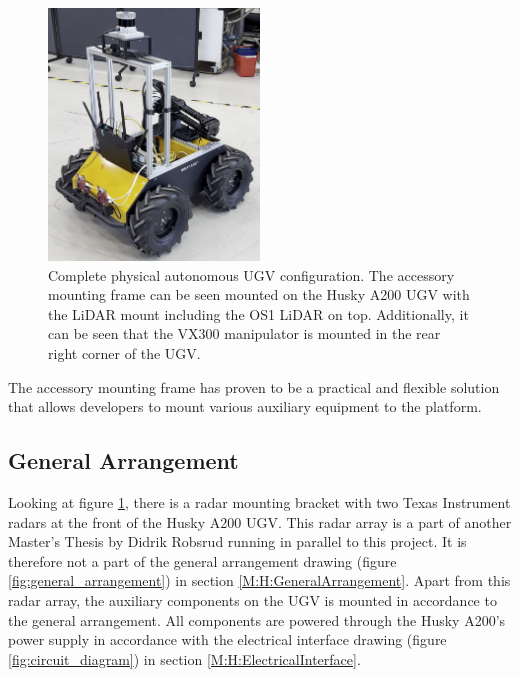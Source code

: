 \begin{figure}[ht]
  \centering
  \includegraphics[width = 0.5\textwidth]{Figures/figHuskyComplete.png}
  \caption{Complete physical autonomous UGV configuration. The accessory mounting frame can be seen mounted on the Husky A200 UGV with the LiDAR mount including the OS1 LiDAR on top. Additionally, it can be seen that the VX300 manipulator is mounted in the rear right corner of the UGV.}
  \label{fig:huskyComplete}
\end{figure}

The accessory mounting frame has proven to be a practical and flexible solution that allows developers to mount various auxiliary equipment to the platform. 

\subsection{General Arrangement}\label{sec:R&D:GeneralArrangement}
Looking at figure \ref{fig:huskyComplete}, there is a radar mounting bracket with two Texas Instrument radars at the front of the Husky A200 UGV. This radar array is a part of another Master's Thesis by Didrik Robsrud running in parallel to this project. It is therefore not a part of the general arrangement drawing (figure \ref{fig:general_arrangement}) in section \ref{M:H:GeneralArrangement}. Apart from this radar array, the auxiliary components on the UGV is mounted in accordance to the general arrangement. All components are powered  through the Husky A200's power supply in accordance with the electrical interface drawing (figure \ref{fig:circuit_diagram}) in section \ref{M:H:ElectricalInterface}.

